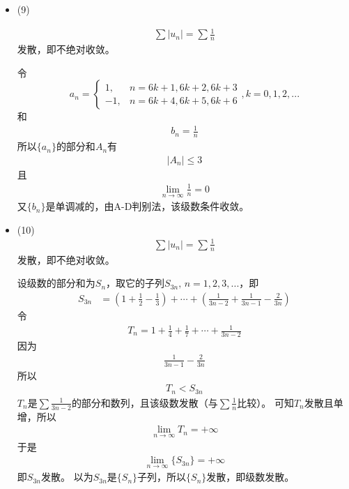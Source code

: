 \documentclass{article}
\begin{document}
\begin{itemize}
  \item (9)

        \begin{align*}
          \sum |u_n| = \sum \frac{1}{n}
        \end{align*}
        发散，即不绝对收敛。

        令
        \begin{equation*}
          a_n =
          \begin{cases}
            1,  & n = 6k + 1, 6k + 2, 6k + 3 \\
            -1, & n = 6k + 4, 6k + 5, 6k + 6
          \end{cases}
          ,k = 0, 1, 2, ...
        \end{equation*}
        和
        \begin{align*}
          b_n = \frac{1}{n}
        \end{align*}
        所以$\{a_n\}$的部分和$A_n$有
        \begin{align*}
          |A_n| \leq 3
        \end{align*}
        且
        \begin{align*}
          \lim\limits_{n \to \infty} \frac{1}{n} = 0
        \end{align*}
        又$\{b_n\}$是单调减的，由A-D判别法，该级数条件收敛。

  \item (10)
        \begin{align*}
          \sum |u_n| = \sum \frac{1}{n}
        \end{align*}
        发散，即不绝对收敛。

        设级数的部分和为$S_n$，取它的子列$S_{3n}, \, n = 1, 2, 3, ...$，即
        \begin{align*}
          S_{3n}
           & = (1 + \frac{1}{2} - \frac{1}{3}) + \cdots + (\frac{1}{3n - 2} + \frac{1}{3n - 1} - \frac{2}{3n})
        \end{align*}
        令
        \begin{align*}
          T_n = 1 + \frac{1}{4} + \frac{1}{7} + \cdots + \frac{1}{3n - 2}
        \end{align*}
        因为
        \begin{align*}
          \frac{1}{3n - 1} - \frac{2}{3n}
        \end{align*}
        所以
        \begin{align*}
          T_n < S_{3n}
        \end{align*}
        $T_n$是$\sum \frac{1}{3n - 2}$的部分和数列，且该级数发散（与$\sum \frac{1}{n}$比较）。
        可知$T_n$发散且单增，所以
        \begin{align*}
          \lim\limits_{n \to \infty} T_n = +\infty
        \end{align*}
        于是
        \begin{align}
          \lim\limits_{n \to \infty} \{S_{3n}\} = +\infty
        \end{align}
        即$S_{3n}$发散。
        以为$S_{3n}$是$\{S_n\}$子列，所以$\{S_n\}$发散，即级数发散。

\end{itemize}
\end{document}
